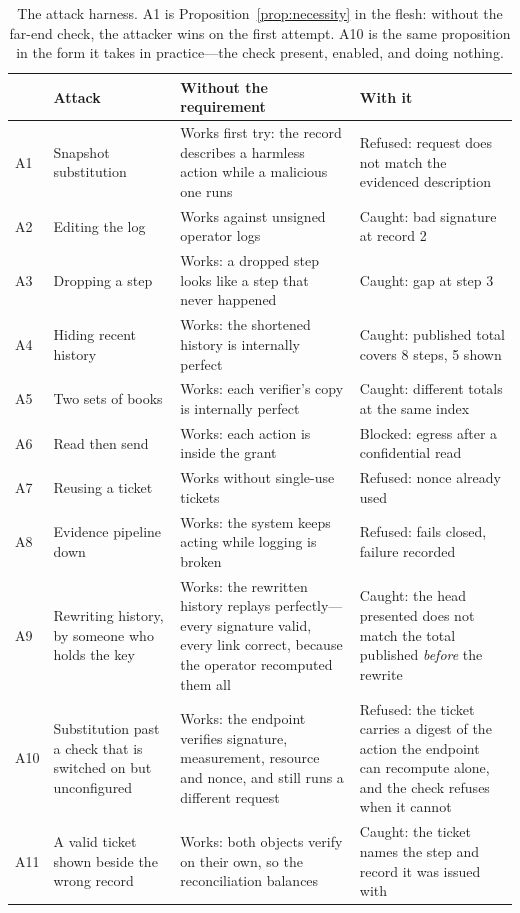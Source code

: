 \documentclass[11pt]{article}
\begin{document}
\begin{table}[ht]
\centering\footnotesize
\begin{tabular}{@{}p{0.5cm}p{3.3cm}p{4.6cm}p{5.2cm}@{}}
\toprule
& \textbf{Attack} & \textbf{Without the requirement} & \textbf{With it} \\
\midrule
A1 & Snapshot substitution & Works first try: the record describes a harmless
action while a malicious one runs & Refused: request does not match the
evidenced description \\
A2 & Editing the log & Works against unsigned operator logs &
Caught: bad signature at record 2 \\
A3 & Dropping a step & Works: a dropped step looks like a step that never
happened & Caught: gap at step 3 \\
A4 & Hiding recent history & Works: the shortened history is internally
perfect & Caught: published total covers 8 steps, 5 shown \\
A5 & Two sets of books & Works: each verifier's copy is internally perfect &
Caught: different totals at the same index \\
A6 & Read then send & Works: each action is inside the grant &
Blocked: egress after a confidential read \\
A7 & Reusing a ticket & Works without single-use tickets &
Refused: nonce already used \\
A8 & Evidence pipeline down & Works: the system keeps acting while logging is
broken & Refused: fails closed, failure recorded \\
A9 & Rewriting history, by someone who holds the key & Works: the rewritten
history replays perfectly---every signature valid, every link correct, because
the operator recomputed them all & Caught: the head presented does not match the
total published \emph{before} the rewrite \\
A10 & Substitution past a check that is switched on but unconfigured & Works:
the endpoint verifies signature, measurement, resource and nonce, and still runs
a different request & Refused: the ticket carries a digest of the action the
endpoint can recompute alone, and the check refuses when it cannot \\
A11 & A valid ticket shown beside the wrong record & Works: both objects verify
on their own, so the reconciliation balances & Caught: the ticket names the step
and record it was issued with \\
\bottomrule
\end{tabular}
\caption{The attack harness. A1 is Proposition~\ref{prop:necessity} in the
flesh: without the far-end check, the attacker wins on the first attempt. A10 is
the same proposition in the form it takes in practice---the check present,
enabled, and doing nothing.}
\label{tab:attacks}
\end{table}
\end{document}
